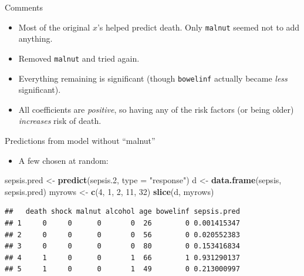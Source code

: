 \documentclass[ignorenonframetext,]{beamer}
\newenvironment{Shaded}{\begin{snugshade}}{\end{snugshade}}
\newcommand{\DataTypeTok}[1]{\textcolor[rgb]{0.13,0.29,0.53}{#1}}
\newcommand{\DecValTok}[1]{\textcolor[rgb]{0.00,0.00,0.81}{#1}}
\newcommand{\FloatTok}[1]{\textcolor[rgb]{0.00,0.00,0.81}{#1}}
\newcommand{\KeywordTok}[1]{\textcolor[rgb]{0.13,0.29,0.53}{\textbf{#1}}}
\newcommand{\NormalTok}[1]{#1}
\newcommand{\StringTok}[1]{\textcolor[rgb]{0.31,0.60,0.02}{#1}}
\providecommand{\tightlist}{%
  \setlength{\itemsep}{0pt}\setlength{\parskip}{0pt}}
\begin{document}
\begin{frame}[fragile]{Comments}
\protect\hypertarget{comments-12}{}

\begin{itemize}
\item
  Most of the original \(x\)'s helped predict death. Only
  \texttt{malnut} seemed not to add anything.
\item
  Removed \texttt{malnut} and tried again.
\item
  Everything remaining is significant (though \texttt{bowelinf} actually
  became \emph{less} significant).
\item
  All coefficients are \emph{positive}, so having any of the risk
  factors (or being older) \emph{increases} risk of death.
\end{itemize}

\end{frame}

\begin{frame}[fragile]{Predictions from model without ``malnut''}
\protect\hypertarget{predictions-from-model-without-malnut}{}

\begin{itemize}
\tightlist
\item
  A few chosen at random:
\end{itemize}

\normalsize

\begin{Shaded}
\begin{Highlighting}[]
\NormalTok{sepsis.pred <-}\StringTok{ }\KeywordTok{predict}\NormalTok{(sepsis}\FloatTok{.2}\NormalTok{, }\DataTypeTok{type =} \StringTok{"response"}\NormalTok{)}
\NormalTok{d <-}\StringTok{ }\KeywordTok{data.frame}\NormalTok{(sepsis, sepsis.pred)}
\NormalTok{myrows <-}\StringTok{ }\KeywordTok{c}\NormalTok{(}\DecValTok{4}\NormalTok{, }\DecValTok{1}\NormalTok{, }\DecValTok{2}\NormalTok{, }\DecValTok{11}\NormalTok{, }\DecValTok{32}\NormalTok{)}
\KeywordTok{slice}\NormalTok{(d, myrows)}
\end{Highlighting}
\end{Shaded}

\begin{verbatim}
##   death shock malnut alcohol age bowelinf sepsis.pred
## 1     0     0      0       0  26        0 0.001415347
## 2     0     0      0       0  56        0 0.020552383
## 3     0     0      0       0  80        0 0.153416834
## 4     1     0      0       1  66        1 0.931290137
## 5     1     0      0       1  49        0 0.213000997
\end{verbatim}

\normalsize

\end{frame}
\end{document}
